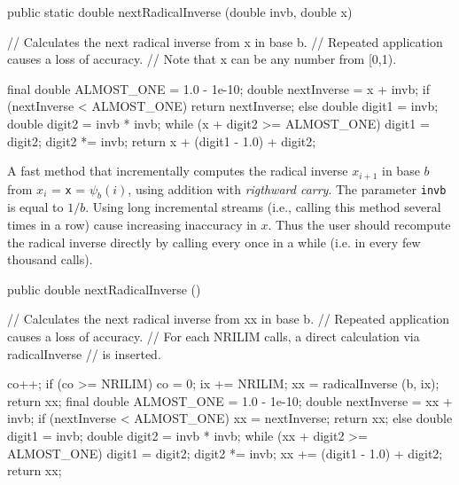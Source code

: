 \begin{htmlonly}
\end{htmlonly}
\begin{code} 

   public static double nextRadicalInverse (double invb, double x) \begin{hide} {
      // Calculates the next radical inverse from x in base b.
      // Repeated application causes a loss of accuracy.
      // Note that x can be any number from [0,1).

      final double ALMOST_ONE = 1.0 - 1e-10;
      double nextInverse = x + invb;
      if (nextInverse < ALMOST_ONE)
         return nextInverse;
      else {
         double digit1 = invb;
         double digit2 = invb * invb;
         while (x + digit2 >= ALMOST_ONE) {
            digit1 = digit2;
            digit2 *= invb;
         }
         return x + (digit1 - 1.0) + digit2;
      }
   }
\end{hide}
\end{code}
 \begin{tabb}
   A fast method that incrementally computes the radical inverse $x_{i+1}$ 
   in base $b$ from $x_i$ = \texttt{x} = $\psi_b(i)$,  %
   using addition with {\em rigthward carry}.
   The parameter \texttt{invb} is equal to $1/b$.
   Using long incremental streams (i.e., calling this method several times
   in a row) cause increasing inaccuracy in $x$. Thus the user should
   recompute the radical inverse directly by calling
    every once in a while (i.e. in every few
   thousand  calls).
 \end{tabb}
\begin{htmlonly}
\end{htmlonly}
\begin{code}

   public double nextRadicalInverse () \begin{hide} {
      // Calculates the next radical inverse from xx in base b.
      // Repeated application causes a loss of accuracy.
      // For each NRILIM calls, a direct calculation via radicalInverse
      // is inserted.

      co++;
      if (co >= NRILIM) {
         co = 0;
         ix += NRILIM;
         xx = radicalInverse (b, ix);
         return xx;
      }
      final double ALMOST_ONE = 1.0 - 1e-10;
      double nextInverse = xx + invb;
      if (nextInverse < ALMOST_ONE) {
         xx = nextInverse;
         return xx;
      } else {
         double digit1 = invb;
         double digit2 = invb * invb;
         while (xx + digit2 >= ALMOST_ONE) {
            digit1 = digit2;
            digit2 *= invb;
         }
         xx += (digit1 - 1.0) + digit2;
         return xx;
      }
   }
\end{hide}
\end{code}
